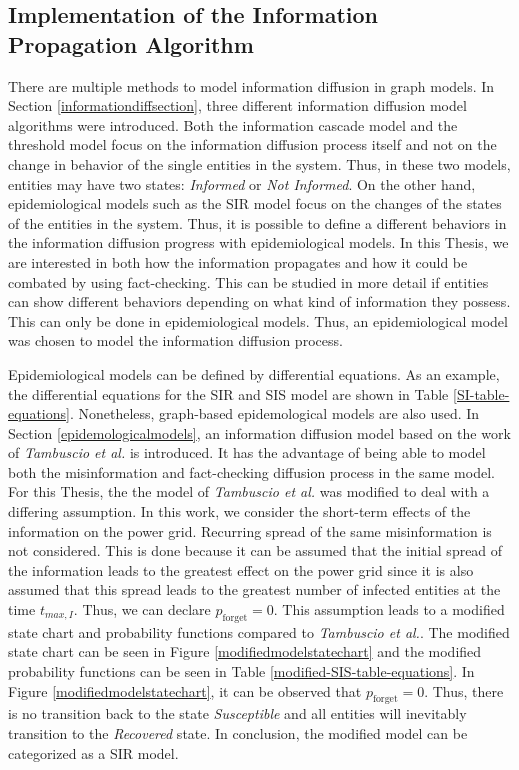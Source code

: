 \subsection{Implementation of the Information Propagation Algorithm}
\label{modelinformationdiffusion}

There are multiple methods to model information diffusion in graph models.
In Section \ref{informationdiffsection}, three different information diffusion
model algorithms were introduced.
Both the information cascade model and the threshold model focus on the 
information diffusion process itself and not on the change in behavior
of the single entities in the system. Thus, in these two models,
entities may have two states: 
\textit{Informed} or \textit{Not Informed}.
On the other hand, epidemiological models such as the SIR model
focus on the changes of the states of the entities in the system.
Thus, it is possible to define a different behaviors in the
information diffusion progress with epidemiological models. 
In this Thesis, we are interested in both how the information
propagates and how it could be combated by using fact-checking.
This can be studied in more detail if entities can 
show different behaviors depending on what kind of information
they possess. This can only be done in epidemiological models.
Thus, an epidemiological model was chosen to model the information 
diffusion process.

Epidemiological models can be defined by differential equations.
As an example, the differential equations for the SIR and SIS 
model are shown in Table \ref{SI-table-equations}.
Nonetheless, graph-based epidemological models are also used.
In Section \ref{epidemologicalmodels}, an information 
diffusion model based on the work of \textit{Tambuscio et al.} 
\cite{sirsmodel} is introduced. It has the advantage of being 
able to model both the misinformation and fact-checking 
diffusion process in the same model. 
For this Thesis, the the model of \textit{Tambuscio et al.} was
modified to deal with a differing assumption.
In this work, we consider the short-term effects of the information 
on the power grid. Recurring spread of the same misinformation
is not considered. This is done because it can be 
assumed that the initial spread of the information leads to the 
greatest effect on the power grid since it is also assumed that this
spread leads to the greatest number of infected entities at
the time $t_{max,I}$. Thus, we can declare $p_{\mathrm{forget}} = 0$.
This assumption leads to a modified state chart and probability
functions compared to \textit{Tambuscio et al.}. The modified
state chart can be seen in Figure \ref{modifiedmodelstatechart}
and the modified probability functions can be seen in Table
\ref{modified-SIS-table-equations}. In Figure 
\ref{modifiedmodelstatechart}, it can be observed that 
$p_{\mathrm{forget}} = 0$. Thus, there is no transition back to 
the state \textit{Susceptible} and all entities
will inevitably transition to the \textit{Recovered} state. 
In conclusion, the modified model can be categorized as a SIR model. 


